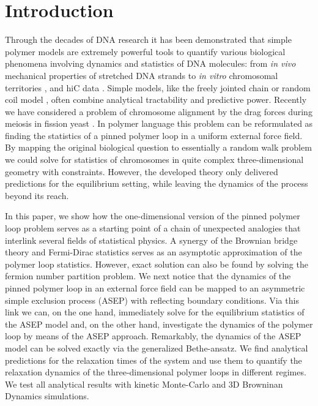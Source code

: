 \documentclass[aps,showpacs,twocolumn,floatfix,prx,superscriptaddress]{revtex4-1}
\begin{document}
\section{Introduction}
Through the decades of DNA research it has been demonstrated that simple polymer models are extremely powerful tools to quantify various biological phenomena involving dynamics and statistics of DNA molecules: from {\em in vivo} mechanical properties of stretched DNA strands \cite{} to {\em in vitro} chromosomal territories \cite{}, and hiC data \cite{}. Simple models, like the freely jointed chain or random coil model \cite{}, often combine analytical tractability and predictive power. Recently we have considered a problem of chromosome alignment by the drag forces during meiosis in fission yeast \cite{}. In polymer language this problem can be reformulated as finding the statistics of a pinned polymer loop in a uniform external force field. By mapping the original biological question to essentially a random walk problem we could solve for statistics of chromosomes in quite complex three-dimensional geometry with constraints. However, the developed theory only delivered predictions for the equilibrium setting, while leaving the dynamics of the process beyond its reach. %

In this paper, we show how the one-dimensional version of the pinned polymer loop problem serves as a starting point of a chain of unexpected analogies that interlink several fields of statistical physics. A synergy of the Brownian bridge theory and Fermi-Dirac statistics serves as an asymptotic approximation of the polymer loop statistics. However, exact solution can also be found by solving the fermion number partition problem. We next notice that the dynamics of the pinned polymer loop in an external force field can be mapped to an asymmetric simple exclusion process (ASEP) with reflecting boundary conditions. Via this link we can, on the one hand, immediately solve for the equilibrium statistics of the ASEP model and, on the other hand, investigate the dynamics of the polymer loop by means of the ASEP approach. Remarkably, the dynamics of the ASEP model can be solved exactly via the generalized Bethe-ansatz. We find analytical predictions for the relaxation times of the system and use them to quantify the relaxation dynamics of the three-dimensional polymer loops in different regimes. We test all analytical results with kinetic Monte-Carlo and 3D Browninan Dynamics simulations. 
\end{document}
